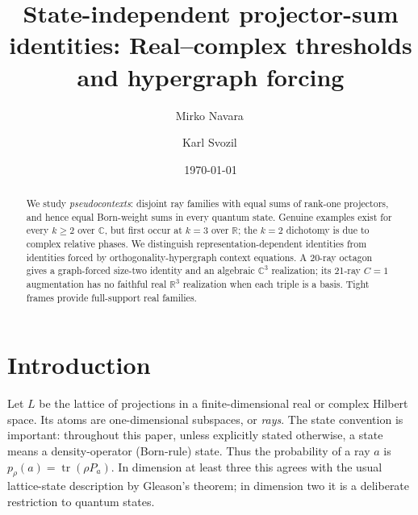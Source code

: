 \documentclass[
  twocolumn,
  aps,
  pra,
  floatfix,
  amsmath,amssymb,
  longbibliography
]{revtex4-2}
\theoremstyle{definition}
\theoremstyle{remark}
\begin{document}
\title{State-independent projector-sum identities: Real--complex thresholds and hypergraph forcing}

\author{Mirko Navara\,}

\author{Karl Svozil\,}

\date{\today}

\begin{abstract}
We study \emph{pseudocontexts}: disjoint ray families with equal sums of rank-one projectors, and hence equal Born-weight sums in every quantum state.  Genuine examples exist for every \(k\ge2\) over \(\mathbb C\), but first occur at \(k=3\) over \(\mathbb R\); the \(k=2\) dichotomy is due to complex relative phases.  We distinguish representation-dependent identities from identities forced by orthogonality-hypergraph context equations.  A 20-ray octagon gives a graph-forced size-two identity and an algebraic \(\mathbb C^3\) realization; its 21-ray \(C=1\) augmentation has no faithful real \(\mathbb R^3\) realization when each triple is a basis.  Tight frames provide full-support real families.
\end{abstract}

\maketitle

\section{Introduction}

Let $L$ be the lattice of projections in a finite-dimensional real or
complex Hilbert space.  Its atoms are one-dimensional subspaces, or
\emph{rays}.  The state convention is important: throughout this paper,
unless explicitly stated otherwise, a state means a density-operator
(Born-rule) state.  Thus the probability of a ray $a$ is
$p_\rho(a)=\operatorname{tr}(\rho P_a)$.  In dimension at least three
this agrees with the usual lattice-state description by Gleason's theorem;
in dimension two it is a deliberate restriction to quantum states.
\end{document}
